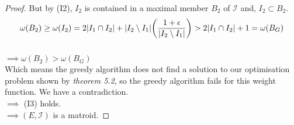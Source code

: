 \documentclass[../main.tex]{subfiles}
\begin{document}
\begin{proof}
But by (I2), $I_2$ is contained in a maximal member $B_2$ of $\mathcal{I}$ and, $I_2 \subset B_2.$\\
\[
\omega(B_2) \geq \omega(I_2) = 2|I_1 \cap I_2| + |I_2 \setminus I_1| \bigg(\frac{1+\epsilon}{|I_2 \setminus I_1|} \bigg)\\
> 2|I_1 \cap I_2| + 1 = \omega(B_G)
\]\\
$\implies \omega(B_2) > \omega(B_G)$\\
Which means the greedy algorithm does not find a solution to our optimisation problem shown by \textit{theorem 5.2}, so the greedy algorithm fails for this weight function. We have a contradiction.\\
$\implies$ (I3) holds.\\
$\implies (E,\mathcal{I})$ is a matroid.
\end{proof}
\end{document}
